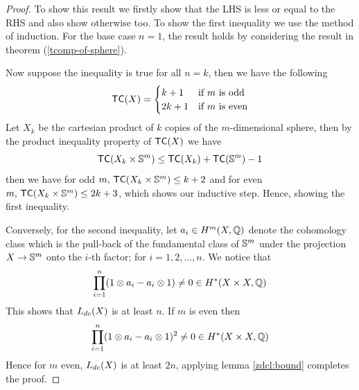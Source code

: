 \begin{proof}
    To show this result we firstly show that the LHS is less or equal to the RHS and also show otherwise too. 
    To show the first inequality we use the method of induction. 
    For the base case $n = 1$, the result holds by considering the result in theorem  (\ref{tcomp-of-sphere}).

    Now suppose the inequality is true for all $n = k$, then we have the following
    \[
        \textsf{TC}(X) = \begin{cases}
            k + 1  & \text{if $m$ is odd}  \\
            2k + 1 & \text{if $m$ is even}
        \end{cases}
    \]
    Let $X_k$ be the cartesian product of $k$ copies of the $m$-dimensional sphere, then by the product inequality property of $\textsf{TC}(X)$ we have
    \[
        \textsf{TC}(X_k \times \mathbb{S}^m) \le \textsf{TC}(X_k) + \textsf{TC}(\mathbb{S}^m) - 1
    \]
    then we have for odd $m,\, \textsf{TC}(X_k \times \mathbb{S}^m) \le k +2$ and for even $m,\, \textsf{TC}(X_k \times \mathbb{S}^m) \le 2k +3$, which shows our inductive step. 
    Hence, showing the first inequality.

    Conversely, for the second inequality, let $a_i \in H^m(X, \mathbb{Q})$ denote the cohomology class which is the pull-back of the fundamental class of $\mathbb{S}^m$ under the projection $X \rightarrow \mathbb{S}^m$ onto the $i$-th factor; for $i = 1, 2, \ldots, n$. 
    We notice that
    \[
        \prod_{i=1}^{n} (1 \otimes a_i - a_i \otimes 1) \neq 0 \in H^*(X \times X, \mathbb{Q})
    \]
    This shows that $L_{dc}(X)$ is at least $n$. If $m$ is even then
    \[
        \prod_{i=1}^{n} (1 \otimes a_i - a_i \otimes 1)^2 \neq 0 \in H^*(X \times X, \mathbb{Q})
    \]
    Hence for $m$ even, $L_{dc}(X)$ is at least $2n$, applying lemma \ref{zdcl:bound} completes the proof.

\end{proof}

